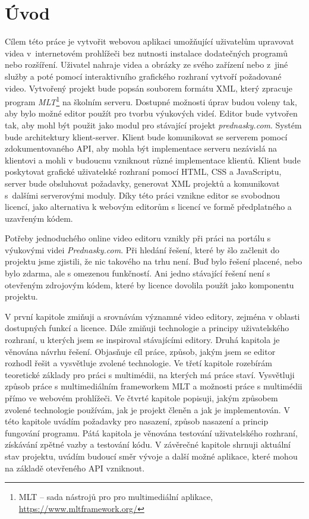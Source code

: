 \chapter{Úvod}
Cílem této práce je vytvořit webovou aplikaci umožňující uživatelům upravovat videa v~internetovém prohlížeči bez nutnosti instalace dodatečných programů nebo rozšíření. Uživatel nahraje videa a obrázky ze svého zařízení nebo z~jiné služby a poté pomocí interaktivního grafického rozhraní vytvoří požadované video. Vytvořený projekt bude popsán souborem formátu XML, který zpracuje program \textit{MLT}\footnote{MLT -- sada nástrojů pro pro multimediální aplikace, \url{https://www.mltframework.org/}} na školním serveru. Dostupné možnosti úprav budou voleny tak, aby bylo možné editor použít pro tvorbu výukových videí. Editor bude vytvořen tak, aby mohl být použit jako modul pro stávající projekt \textit{prednasky.com}.
Systém bude architektury klient-server. Klient bude komunikovat se serverem pomocí zdokumentovaného API, aby mohla být implementace serveru nezávislá na klientovi a mohli v budoucnu vzniknout různé implementace klientů. Klient bude poskytovat grafické uživatelské rozhraní pomocí HTML, CSS a JavaScriptu, server bude obsluhovat požadavky, generovat XML projektů a komunikovat s~dalšími serverovými moduly. Díky této práci vznikne editor se svobodnou licencí, jako alternativa k webovým editorům s licencí ve formě předplatného a uzavřeným kódem.

Potřeby jednoduchého online video editoru vznikly při práci na portálu s výukovými videi \textit{Prednasky.com}. Při hledání řešení, které by šlo začlenit do projektu jsme zjistili, že nic takového na trhu není. Buď bylo řešení placené, nebo bylo zdarma, ale s omezenou funkčností. Ani jedno stávající řešení není s otevřeným zdrojovým kódem, které by licence dovolila použít jako komponentu projektu.

V první kapitole zmiňuji a srovnávám významné video editory, zejména v oblasti dostupných funkcí a licence. Dále zmiňuji technologie a principy uživatelského rozhraní, u kterých jsem se inspiroval stávajícími editory. Druhá kapitola je věnována návrhu řešení. Objasňuje cíl práce, způsob, jakým jsem se editor rozhodl řešit a vysvětluje zvolené technologie. Ve třetí kapitole rozebírám teoretické základy pro práci s multimédii, na kterých má práce staví. Vysvětluji způsob práce s multimediálním frameworkem MLT a možnosti práce s multimédii přímo ve webovém prohlížeči. Ve čtvrté kapitole popisuji, jakým způsobem zvolené technologie používám, jak je projekt členěn a jak je implementován. V této kapitole uvádím požadavky pro nasazení, způsob nasazení a princip fungování programu. Pátá kapitola je věnována testování uživatelského rozhraní, získávání zpětné vazby a testování kódu. V závěrečné kapitole shrnuji aktuální stav projektu, uvádím budoucí směr vývoje a další možné aplikace, které mohou na základě otevřeného API vzniknout.

